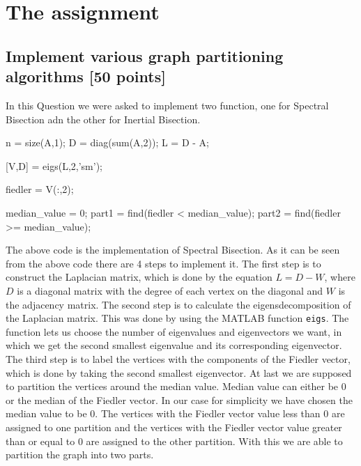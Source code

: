 \documentclass[unicode,11pt,a4paper,oneside,numbers=endperiod,openany]{scrartcl}
\begin{document}
\setassignment
{}

\newline

\assignmentpolicy

\newpage

\section{The assignment}

\subsection{Implement various graph partitioning algorithms [50 points]}
In this Question we were asked to implement two function, one for Spectral Bisection adn the other for Inertial Bisection.

\begin{mcode}
    n = size(A,1);
    D = diag(sum(A,2));
    L = D - A;

    [V,D] = eigs(L,2,'sm');

    fiedler = V(:,2);

    median_value = 0;
    part1 = find(fiedler < median_value);
    part2 = find(fiedler >= median_value);
\end{mcode}

The above code is the implementation of Spectral Bisection. As it can be seen from the above code there are 4 steps to implement it. The first step is to construct the Laplacian matrix, which is done by the equation $L = D - W$, where $D$ is a diagonal matrix with the degree of each vertex on the diagonal and $W$ is the adjacency matrix. The second step is to calculate the eigensdecomposition of the Laplacian matrix. This was done by using the MATLAB function \texttt{eigs}. The function lets us choose the number of eigenvalues and eigenvectors we want, in which we get the second smallest eigenvalue and its corresponding eigenvector. The third step is to label the vertices with the components of the Fiedler vector, which is done by taking the second smallest eigenvector. At last we are supposed to partition the vertices around the median value. Median value can either be 0 or the median of the Fiedler vector. In our case for simplicity we have chosen the median value to be 0. The vertices with the Fiedler vector value less than 0 are assigned to one partition and the vertices with the Fiedler vector value greater than or equal to 0 are assigned to the other partition. With this we are able to partition the graph into two parts.
\end{document}

